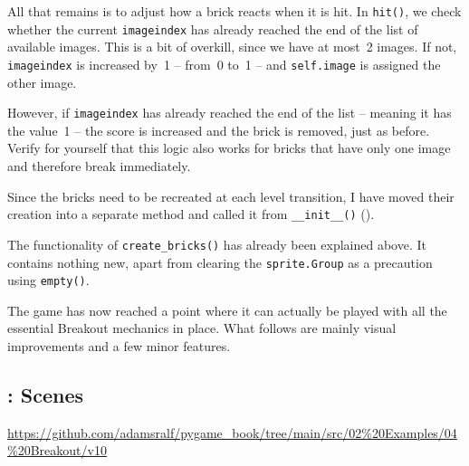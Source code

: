 All that remains is to adjust how a brick reacts when it is hit. In \texttt{hit()}, we check whether the current \texttt{imageindex} has already reached the end of the list of available images. This is a bit of overkill, since we have at most~2 images. If not, \texttt{imageindex} is increased by~1 -- from~0 to~1 -- and \texttt{self.image} is assigned the other image.

However, if \texttt{imageindex} has already reached the end of the list -- meaning it has the value~1 -- the score is increased and the brick is removed, just as before. Verify for yourself that this logic also works for bricks that have only one image and therefore break immediately.


Since the bricks need to be recreated at each level transition, I have moved their creation into a separate method and called it from \texttt{\_\_init\_\_()} ().


The functionality of \texttt{create\_bricks()} has already been explained above. It contains nothing new, apart from clearing the \texttt{sprite.Group} as a precaution using \texttt{empty()}.


The game has now reached a point where it can actually be played with all the essential Breakout mechanics in place. What follows are mainly visual improvements and a few minor features.

\newpage
\subsection{: Scenes}

\begin{diskbox}
	\url{https://github.com/adamsralf/pygame_book/tree/main/src/02%20Examples/04%20Breakout/v10}
\end{diskbox}

